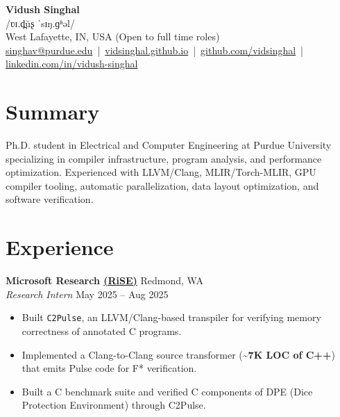 \documentclass[10pt,letterpaper]{article}
\newcommand{\ipa}[1]{{\ipafont /#1/}}
\begin{document}

\begin{center}
  {\Huge\textbf{Vidush Singhal}}\\[3pt]
  {\small \ipa{ʋɪ.d̪ŭʂ ˈsɪŋ.ɡʱəl}}\\[6pt]
  West Lafayette, IN, USA (Open to full time roles) \\
  \href{mailto:singhav@purdue.edu}{\textcolor{ultramarineblue}{singhav@purdue.edu}} \,|\, 
  \href{https://vidsinghal.github.io}{\textcolor{ultramarineblue}{vidsinghal.github.io}} \,|\, 
  \href{https://github.com/vidsinghal}{\textcolor{ultramarineblue}{github.com/vidsinghal}} \,|\, 
  \href{https://linkedin.com/in/vidush-singhal}{\textcolor{ultramarineblue}{linkedin.com/in/vidush-singhal}}\\
\end{center}
\vspace{-15pt}

\section*{Summary}
Ph.D. student in Electrical and Computer Engineering at Purdue University specializing in compiler infrastructure, program analysis, and performance optimization. Experienced with LLVM/Clang, MLIR/Torch-MLIR, GPU compiler tooling, automatic parallelization, data layout optimization, and software verification.
\section*{Experience}

\textbf{Microsoft Research \textcolor{ultramarineblue}{\href{https://www.microsoft.com/en-us/research/group/research-software-engineering-rise/}{(RiSE)}}} \hfill Redmond, WA\\
\textit{Research Intern} \hfill May 2025 -- Aug 2025
\begin{itemize}
  \item Built \texttt{C2Pulse}, an LLVM/Clang-based transpiler for verifying memory correctness of annotated C programs.
  \item Implemented a Clang-to-Clang source transformer (\textbf{\textasciitilde7K LOC of C++}) that emits Pulse code for F* verification.
  \item Built a C benchmark suite and verified C components of DPE (Dice Protection Environment) through C2Pulse.
\end{itemize}
\end{document}

